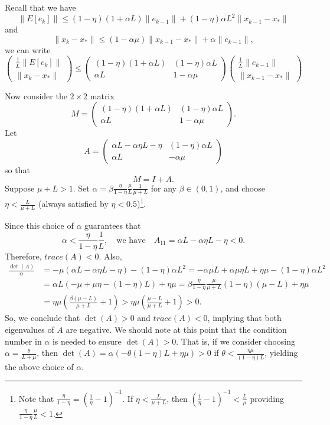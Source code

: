 \documentclass{article}
\begin{document}
\bigskip

\noindent
Recall that we have
\[
  \|E[e_k]\|\leq(1-\eta)(1+\alpha L)\|e_{k-1}\| + (1-\eta)\alpha L^2\|x_{k-1}-x_\ast\|
\]
and
\[
\|x_k-x_\ast\|\leq(1-\alpha\mu)\|x_{k-1}-x_\ast\| +\alpha \|e_{k-1}\|,
\]
we can write
\[
 \begin{pmatrix} \displaystyle\frac{1}{L}\|E[e_k]\| \\
  \|x_k-x_\ast\|
 \end{pmatrix} \leq 
 \begin{pmatrix} (1-\eta)(1+\alpha L) & (1-\eta)\alpha L\\  
                   \alpha L  & 1-\alpha\mu \end{pmatrix}                  
 \begin{pmatrix} \displaystyle\frac{1}{L}\|e_{k-1}\| \\
  \|x_{k-1}-x_\ast\|
 \end{pmatrix}                  
\]

\bigskip
Now consider the $2\times 2$ matrix
\[
M = \begin{pmatrix} (1-\eta)(1+\alpha L) & (1-\eta)\alpha L\\  
                   \alpha L  & 1-\alpha\mu \end{pmatrix}.    
\]
Let 
\[
A = \begin{pmatrix} \alpha L-\alpha\eta L-\eta & (1-\eta)\alpha L\\  
                   \alpha L  & -\alpha\mu \end{pmatrix}  
\]
so that
\[
 M = I + A.
\]
Suppose $\mu+L>1$.  Set $\alpha = \beta \displaystyle\frac{\eta}{1-\eta}\frac{\mu}{L}\frac{1}{\mu+L}$ for any $\beta\in (0,1)$, and choose \ $\displaystyle\eta<\frac{L}{\mu+L}$ (always satisfied by $\eta<0.5$)\footnote{Note that $\frac{\eta}{1-\eta}=(\frac{1}{\eta}-1)^{-1}$.  If $\eta<\frac{L}{\mu+L}$, then $(\frac{1}{\eta}-1)^{-1}<\frac{L}{\mu}$ providing $\frac{\eta}{1-\eta} \frac{\mu}{L}<1$. }.

Since this choice of $\alpha$ guarantees that 
\[
 \alpha < \frac{\eta}{1-\eta}\frac{1}{L},  \quad \mbox{we have} \quad A_{11}=\alpha L-\alpha\eta L-\eta<0.
\]
Therefore, $trace(A)<0$.
Also,
\begin{align*}
 \frac{\det(A)}{\alpha} &= -\mu(\alpha L-\alpha\eta L-\eta)-(1-\eta)\alpha L^2 = -\alpha\mu L+\alpha\mu\eta L+\eta\mu-(1-\eta)\alpha L^2\\
 & =\alpha L(-\mu+\mu\eta-(1-\eta)L)+\eta\mu = \beta \displaystyle\frac{\eta}{1-\eta}\frac{\mu}{\mu+L}(1 -\eta)(\mu-L)+\eta\mu \\
 & = \eta\mu\left(\frac{\beta(\mu-L)}{\mu+L}+1\right) > \eta\mu\left(\frac{\mu-L}{\mu+L}+1\right)>0.
\end{align*}
So, we conclude that $\det(A)>0$ and $trace(A)<0$, implying that both eigenvalues of $A$ are negative.  We should note at this point that the condition number in $\alpha$ is needed to ensure $\det(A)>0$.  That is, if we consider choosing $\alpha=\displaystyle\frac{\theta}{L+\mu}$, then $\det(A)=\alpha(-\theta(1-\eta)L+\eta\mu)>0$ if $\theta<\displaystyle\frac{\eta\mu}{(1-\eta)L}$, yielding the above choice of $\alpha$. 
\end{document}
